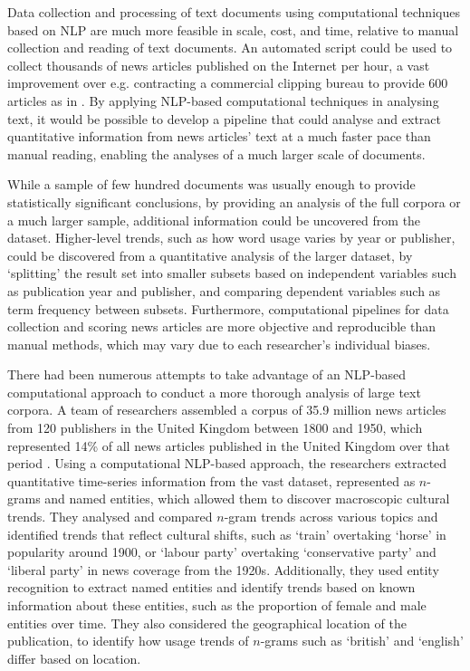 \documentclass{report}
\begin{document}
Data collection and processing of text documents using computational techniques based on NLP are much more feasible in scale, cost, and time, relative to manual collection and reading of text documents. 
An automated script could be used to collect thousands of news articles published on the Internet per hour, a vast improvement over e.g. contracting a commercial clipping bureau to provide 600 articles as in \cite{coverdale2002depictions}.
By applying NLP-based computational techniques in analysing text, it would be possible to develop a pipeline that could analyse and extract quantitative information from news articles' text at a much faster pace than manual reading, enabling the analyses of a much larger scale of documents.

While a sample of few hundred documents was usually enough to provide statistically significant conclusions, by providing an analysis of the full corpora or a much larger sample, additional information could be uncovered from the dataset.
Higher-level trends, such as how word usage varies by year or publisher, could be discovered from a quantitative analysis of the larger dataset, by `splitting' the result set into smaller subsets based on independent variables such as publication year and publisher, and comparing dependent variables such as term frequency between subsets.
Furthermore, computational pipelines for data collection and scoring news articles are more objective and reproducible than manual methods, which may vary due to each researcher's individual biases.

There had been numerous attempts to take advantage of an NLP-based computational approach to conduct a more thorough analysis of large text corpora. 
A team of researchers assembled a corpus of 35.9 million news articles from 120 publishers in the United Kingdom between 1800 and 1950, which represented 14\% of all news articles published in the United Kingdom over that period \cite{lansdall2017content}.
Using a computational NLP-based approach, the researchers extracted quantitative time-series information from the vast dataset, represented as $n$-grams and named entities, which allowed them to discover macroscopic cultural trends. 
They analysed and compared $n$-gram trends across various topics and identified trends that reflect cultural shifts, such as `train' overtaking `horse' in popularity around 1900, or `labour party' overtaking `conservative party' and `liberal party' in news coverage from the 1920s.
Additionally, they used entity recognition to extract named entities and identify trends based on known information about these entities, such as the proportion of female and male entities over time.
They also considered the geographical location of the publication, to identify how usage trends of $n$-grams such as `british' and `english' differ based on location.
\end{document}
